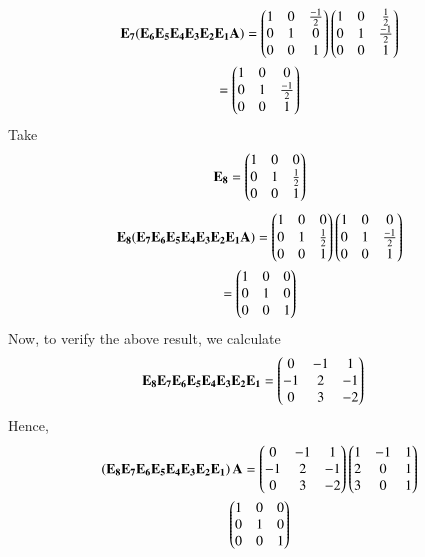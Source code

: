 \documentclass[journal,12pt,twocolumn]{IEEEtran}
\begin{document}
\begin{multline}
	\mathbf{E_7(E_6E_5E_4E_3E_2E_1A)} = \begin{pmatrix}1 & 0 & \frac{-1}{2} \\0 & 1 & 0 \\ 0 & 0 & 1\end{pmatrix}\begin{pmatrix}1 & 0 & \frac{1}{2} \\ 0 & 1 & \frac{-1}{2} \\ 0 & 0 & 1\end{pmatrix}\\
	= \begin{pmatrix}1 & 0 & 0 \\ 0 & 1 & \frac{-1}{2} \\ 0 & 0 & 1\end{pmatrix}
\end{multline}
Take
\begin{align}
	\mathbf{E_8} = \begin{pmatrix}1 & 0 & 0 \\0 & 1 &\frac{1}{2} \\ 0 & 0& 1\end{pmatrix}	
\end{align}
\begin{multline}
	\mathbf{E_8(E_7E_6E_5E_4E_3E_2E_1A)} = \begin{pmatrix}1 & 0 & 0 \\0 & 1 & \frac{1}{2} \\ 0 & 0 & 1\end{pmatrix}\begin{pmatrix}1 & 0 & 0 \\ 0 & 1 & \frac{-1}{2} \\ 0 & 0 & 1\end{pmatrix}\\
	= \begin{pmatrix}1 & 0 & 0 \\0 & 1 & 0 \\ 0 & 0 & 1\end{pmatrix}
\end{multline}
Now, to verify the above result, we calculate
\begin{align}
& \mathbf{E_8E_7E_6E_5E_4E_3E_2E_1}= \begin{pmatrix}0 & -1 & 1 \\ -1 & 2 & -1 \\ 0 & 3 & -2\end{pmatrix} 
\end{align}
Hence,
\begin{multline}
\left(\mathbf{E_8E_7E_6E_5E_4E_3E_2E_1}\right)\mathbf{A} = \begin{pmatrix}0 & -1 & 1 \\ -1 & 2 & -1 \\ 0 & 3 & -2\end{pmatrix}\begin{pmatrix}1 & -1 & 1 \\ 2 & 0 & 1 \\ 3 & 0 & 1\end{pmatrix} \\
\begin{pmatrix}1 & 0 & 0 \\ 0 & 1 & 0 \\ 0 & 0 & 1\end{pmatrix}
\end{multline}
\end{document}
